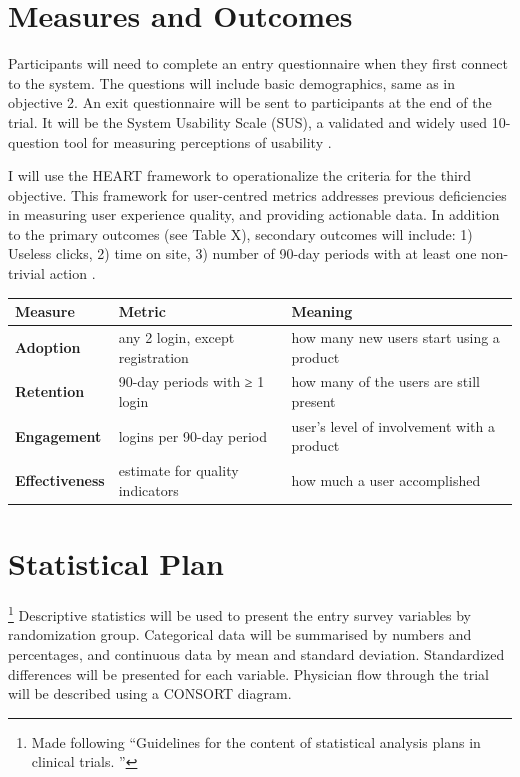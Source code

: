 \section{Measures and Outcomes}
Participants will need to complete an entry questionnaire when they first connect to the system. The questions will include basic demographics, same as in objective 2. An exit questionnaire will be sent to participants at the end of the trial. It will be the System Usability Scale (\gls{SUS}), a validated and widely used 10-question tool for measuring perceptions of usability \cite{united2006research}.

I will use the HEART framework to operationalize the criteria for the third objective. This framework for user-centred metrics addresses previous deficiencies in measuring user experience quality, and providing actionable data. In addition to the primary outcomes (see Table X), secondary outcomes will include: 1) Useless clicks, 2) time on site, 3) number of 90-day periods with at least one non-trivial action \cite{rodden2010measuring}.

\begingroup
\setlength{\tabcolsep}{8pt} %
\renewcommand{\arraystretch}{1.5} %
\small
\begin{table}[h!]
\begin{tabular}{l|l|l}
\textbf{Measure}       & \textbf{Metric}                  & \textbf{Meaning}                           \\
\hline                                                                                                    
\textbf{Adoption}      & any 2 login, except registration & how many new users start using a product   \\
\textbf{Retention}     & 90-day periods with ≥ 1 login    & how many of the users are still present    \\
\textbf{Engagement}    & logins per 90-day period         & user’s level of involvement with a product \\
\textbf{Effectiveness} & estimate for quality indicators  & how much a user accomplished                                       
\end{tabular}
\end{table}
\endgroup

\section{Statistical Plan}\footnote{Made following ``Guidelines for the content of statistical analysis plans in clinical trials. \cite{gamble2017guidelines}''}
Descriptive statistics will be used to present the entry survey variables by randomization group. Categorical data will be summarised by numbers and percentages, and continuous data by mean and standard deviation. Standardized differences will be presented for each variable. Physician flow through the trial will be described using a CONSORT diagram.

